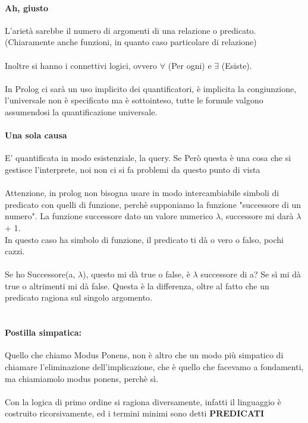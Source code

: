 \documentclass[12pt, a4paper, openany, oneside]{book}
\begin{document}
\paragraph{Ah, giusto} L'arietà sarebbe il numero di argomenti di una relazione o
predicato. (Chiaramente anche funzioni, in quanto caso particolare di relazione)
\\ \\
Inoltre si hanno i connettivi logici, ovvero $\forall$ (Per ogni) e $\exists$ 
(Esiste). \\ \\
In Prolog ci sarà un uso implicito dei quantificatori, è implicita la 
congiunzione, l'universale non è specificato ma è sottointeso, tutte le formule 
valgono assumendosi la quantificazione universale. 
\paragraph{Una sola causa} E' quantificata in modo esistenziale, la query. Se 
Però questa è una cosa che si gestisce l'interprete, noi non ci si fa problemi 
da questo punto di vista
\\ \\
Attenzione, in prolog non bisogna usare in modo intercambiabile simboli di 
predicato con quelli di funzione, perchè supponiamo la funzione "successore di 
un numero". La funzione successore dato un valore numerico $\lambda$, successore
mi darà $\lambda$ + 1.
\\ 
In questo caso ha simbolo di funzione, il predicato ti dà o vero o falso, pochi 
cazzi.
\\ \\
Se ho Successore(a, $\lambda$), questo mi dà true o false, è $\lambda$ successore
di a? Se sì mi dà true o altrimenti mi dà false. Questa è la differenza, oltre al
fatto che un predicato ragiona sul singolo argomento.
\\ \\
\paragraph{Postilla simpatica: }Quello che chiamo Modus Ponens, non è altro che 
un modo più simpatico di chiamare l'eliminazione dell'implicazione, che è quello
che facevamo a fondamenti, ma chiamiamolo modus ponens, perchè sì. 
\\ \\
Con la logica di primo ordine si ragiona diversamente, infatti il linguaggio
è costruito ricorsivamente, ed i termini minimi sono detti \textbf{PREDICATI}
\end{document}
